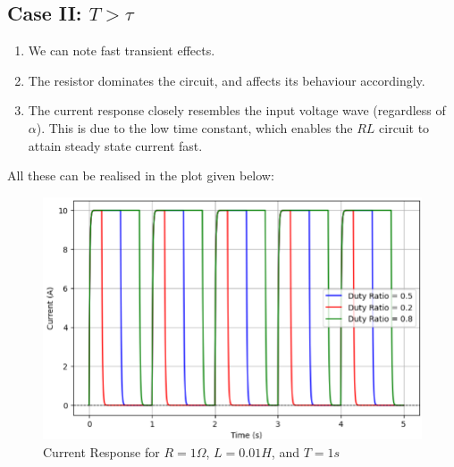 \begin{multicols}{2}
\subsection{Case II: $T>\tau$}
\begin{enumerate}
    \item We can note fast transient effects.
    \item The resistor dominates the circuit, and affects its behaviour accordingly.
    \item The current response closely resembles the input voltage wave (regardless of $\alpha$). This is due to the low time constant, which enables the $RL$ circuit to attain steady state current fast.
\end{enumerate}
All these can be realised in the plot given below: \\
\begin{figure}[H]
  \centering
  \includegraphics[width=\columnwidth]{sections/6_case2.png}
  \caption{Current Response for $R=1\Omega$, $L=0.01H$, and $T=1s$}
\end{figure}


\end{multicols}
